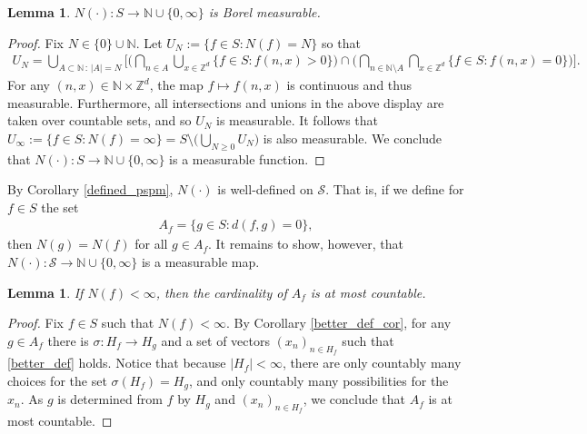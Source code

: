 \documentclass[11pt,reqno]{amsart}
\numberwithin{equation}{section}
\newtheorem{lemma}[thm]{Lemma}
\theoremstyle{definition}
\begin{document}
\begin{lemma} \label{N_meas1}
$N(\cdot) : S \to {\mathbb{N}} \cup \{0,\infty\}$ is Borel measurable.
\end{lemma}

\begin{proof}
Fix $N \in \{0\} \cup {\mathbb{N}}$.
Let $U_N := \{f \in S : N(f) = N\}$ so that
{\begin{align*} {
U_N = \bigcup_{A \subset {\mathbb{N}}\, :\, |A| = N} \Bigg[\bigg(\bigcap_{n \in A} \bigcup_{x \in {\mathbb{Z}}^d} \{f \in S : f(n,x) > 0\} \bigg) \cap \bigg(\bigcap_{n \in {\mathbb{N}} \setminus A} \bigcap_{x \in {\mathbb{Z}}^d} \{f \in S : f(n,x) = 0\}\bigg)\Bigg].
} \end{align*}}
For any $(n,x) \in {\mathbb{N}} \times {\mathbb{Z}}^d$, the map $f \mapsto f(n,x)$ is continuous and thus measurable.
Furthermore, all intersections and unions in the above display are taken over countable sets, and so $U_N$ is measurable.
It follows that $U_\infty := \{f \in S : N(f) = \infty\} = S \setminus \big(\bigcup_{N \geq 0} U_N\big)$ is also measurable.
We conclude that $N(\cdot) : S \to {\mathbb{N}} \cup \{0,\infty\}$ is a measurable function.
\end{proof}

By Corollary \ref{defined_pspm}, $N(\cdot)$ is well-defined on ${\mathcal{S}}$.
That is, if we define for $f \in S$ the set
{\begin{align*} {
A_f = \{g \in S : d(f,g) = 0\},
} \end{align*}}
then $N(g) = N(f)$ for all $g \in A_f$.
It remains to show, however, that $N(\cdot) : {\mathcal{S}} \to {\mathbb{N}} \cup \{0,\infty\}$ is a measurable map.

\begin{lemma} \label{at_most_countable}
If $N(f) < \infty$, then the cardinality of $A_f$ is at most countable.
\end{lemma}

\begin{proof}
Fix $f \in S$ such that $N(f) < \infty$.
By Corollary \ref{better_def_cor}, for any $g \in A_f$ there is $\sigma : H_f \to H_g$ and a set of vectors $(x_n)_{n \in H_f}$ such that \eqref{better_def} holds.
Notice that because $|H_f| < \infty$, there are only countably many choices for the set $\sigma(H_f) = H_g$, and only countably many possibilities for the $x_n$.
As $g$ is determined from $f$ by $H_g$ and $(x_n)_{n \in H_f}$, we conclude that $A_f$ is at most countable.
\end{proof}
\end{document}
